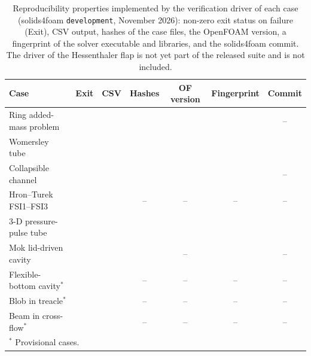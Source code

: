 \begin{table}[htbp]
	\centering
	\footnotesize
	\setlength{\tabcolsep}{4pt}
	\caption{Reproducibility properties implemented by the verification driver of each case (solids4foam \texttt{development}, November 2026): non-zero exit status on failure (Exit), CSV output, hashes of the case files, the OpenFOAM version, a fingerprint of the solver executable and libraries, and the solids4foam commit. The driver of the Hessenthaler flap is not yet part of the released suite and is not included.}
	\label{tab:driver_properties}
	\begin{tabular}{lcccccc}
		\toprule
		Case & Exit & CSV & Hashes & OF version & Fingerprint & Commit \\
		\midrule
		Ring added-mass problem & \checkmark & \checkmark & \checkmark & \checkmark & \checkmark & -- \\
		Womersley tube & \checkmark & \checkmark & \checkmark & \checkmark & \checkmark & \checkmark \\
		Collapsible channel & \checkmark & \checkmark & \checkmark & \checkmark & \checkmark & -- \\
		Hron--Turek FSI1--FSI3 & \checkmark & \checkmark & -- & -- & -- & -- \\
		3-D pressure-pulse tube & \checkmark & \checkmark & \checkmark & \checkmark & \checkmark & \checkmark \\
		Mok lid-driven cavity & \checkmark & \checkmark & \checkmark & -- & \checkmark & -- \\
		Flexible-bottom cavity$^\ast$ & \checkmark & \checkmark & -- & -- & -- & -- \\
		Blob in treacle$^\ast$ & \checkmark & \checkmark & -- & -- & -- & -- \\
		Beam in cross-flow$^\ast$ & \checkmark & \checkmark & -- & -- & -- & -- \\
		\bottomrule
		\multicolumn{7}{l}{$^\ast$ Provisional cases.}
	\end{tabular}
\end{table}
